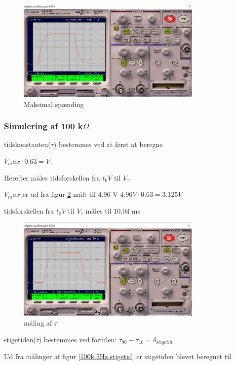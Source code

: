 \begin{figure}[h]
 \begin{center}
  \includegraphics[height=5cm]{P_Fig/figur2_10k_50Hz_min_max}
  \caption{Maksimal spænding}
  \label{10k.50Hz.min.max}
 \end{center}
\end{figure}


\subsubsection{Simulering af 100 k$\Omega$ }
tidskonstanten($\tau$) bestemmes ved at først at beregne 

$V_max \cdot 0.63 = V_{\tau}$

Herefter måles tidsforskellen fra $t_0 V$ til $V_{\tau}$

$V_max$ er ud fra figur \ref{100k.5Hz.tau} målt til 4.96 V
$4.96 V \cdot 0.63 = 3.125 V$

tidsforskellen fra $t_0 V$ til $V_{\tau}$ måles til 10.04 ms

\begin{figure}[h]
 \begin{center}
  \includegraphics[height=5cm]{P_Fig/figur6_100k_5Hz_tau}
  \caption{måling af $\tau$}
  \label{100k.5Hz.tau}
 \end{center}
\end{figure}

stigetiden($\tau$) bestemmes ved formlen:
$\tau_{90} - \tau_{10} = \delta_{stigetid}$

Ud fra målinger af figur \ref{100k.5Hz.stigetid}
er stigetiden blevet beregnet til

